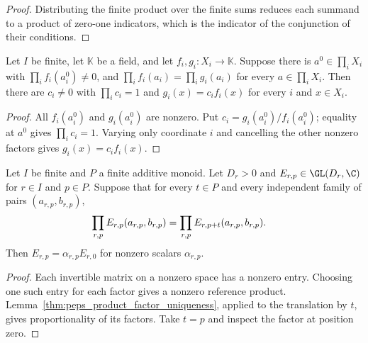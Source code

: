 \begin{proof}\leanok
    Distributing the finite product over the finite sums reduces each summand to a product of
    zero-one indicators, which is the indicator of the conjunction of their conditions.
\end{proof}

\begin{lemma}%
    \label{thm:peps_product_factor_uniqueness}
    \leanok
    Let $I$ be finite, let $\mathbb K$ be a field, and let
    $f_i,g_i:X_i\to\mathbb K$. Suppose there is $a^0\in\prod_iX_i$
    with $\prod_i f_i(a_i^0)\ne0$, and
    $\prod_i f_i(a_i)=\prod_i g_i(a_i)$ for every $a\in\prod_iX_i$.
    Then there are $c_i\ne0$ with $\prod_i c_i=1$ and
    $g_i(x)=c_i f_i(x)$ for every $i$ and $x\in X_i$.
\end{lemma}

\begin{proof}\leanok
    All $f_i(a_i^0)$ and $g_i(a_i^0)$ are nonzero. Put
    $c_i=g_i(a_i^0)/f_i(a_i^0)$; equality at $a^0$ gives
    $\prod_i c_i=1$. Varying only coordinate $i$ and cancelling the
    other nonzero factors gives $g_i(x)=c_i f_i(x)$.
\end{proof}

\begin{lemma}%
    \label{thm:peps_directional_product_factors}
    \leanok
    Let $I$ be finite and $P$ a finite additive monoid. Let
    $D_r>0$ and $E_{r,p}\in\GL(D_r,\C)$ for $r\in I$ and $p\in P$.
    Suppose that for every $t\in P$ and every independent family of pairs
    $(a_{r,p},b_{r,p})$,
    \begin{align}
        \prod_{r,p} E_{r,p}(a_{r,p},b_{r,p})
         & =\prod_{r,p} E_{r,p+t}(a_{r,p},b_{r,p}).\notag
    \end{align}
    Then $E_{r,p}=\alpha_{r,p}E_{r,0}$ for nonzero scalars $\alpha_{r,p}$.
\end{lemma}

\begin{proof}\leanok
    Each invertible matrix on a nonzero space has a nonzero entry.
    Choosing one such entry for each factor gives a nonzero reference product.
    Lemma~\ref{thm:peps_product_factor_uniqueness}, applied to the
    translation by $t$, gives proportionality of its factors. Take $t=p$
    and inspect the factor at position zero.
\end{proof}

